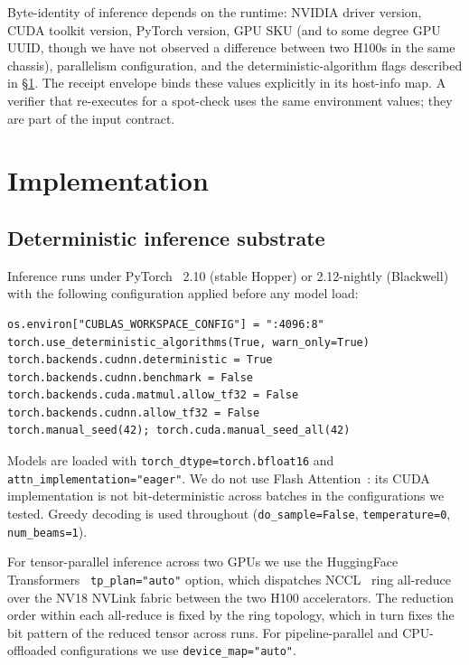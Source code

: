 \documentclass[10pt]{article}
\begin{document}
Byte-identity of inference depends on the runtime: NVIDIA driver version, CUDA toolkit version, PyTorch version, GPU SKU (and to some degree GPU UUID, though we have not observed a difference between two H100s in the same chassis), parallelism configuration, and the deterministic-algorithm flags described in \S\ref{sec:impl}. The receipt envelope binds these values explicitly in its host-info map. A verifier that re-executes for a spot-check uses the same environment values; they are part of the input contract.

\section{Implementation}
\label{sec:impl}

\subsection{Deterministic inference substrate}

Inference runs under PyTorch~\cite{pytorch} 2.10 (stable Hopper) or 2.12-nightly (Blackwell) with the following configuration applied before any model load:

\begin{lstlisting}
os.environ["CUBLAS_WORKSPACE_CONFIG"] = ":4096:8"
torch.use_deterministic_algorithms(True, warn_only=True)
torch.backends.cudnn.deterministic = True
torch.backends.cudnn.benchmark = False
torch.backends.cuda.matmul.allow_tf32 = False
torch.backends.cudnn.allow_tf32 = False
torch.manual_seed(42); torch.cuda.manual_seed_all(42)
\end{lstlisting}

\noindent Models are loaded with \texttt{torch\_dtype=torch.bfloat16} and \texttt{attn\_implementation="eager"}. We do not use Flash Attention~\cite{flashattn}: its CUDA implementation is not bit-deterministic across batches in the configurations we tested. Greedy decoding is used throughout (\texttt{do\_sample=False}, \texttt{temperature=0}, \texttt{num\_beams=1}).

For tensor-parallel inference across two GPUs we use the HuggingFace Transformers~\cite{transformers} \texttt{tp\_plan="auto"} option, which dispatches NCCL~\cite{nccl} ring all-reduce over the NV18 NVLink fabric between the two H100 accelerators. The reduction order within each all-reduce is fixed by the ring topology, which in turn fixes the bit pattern of the reduced tensor across runs. For pipeline-parallel and CPU-offloaded configurations we use \texttt{device\_map="auto"}.
\end{document}
